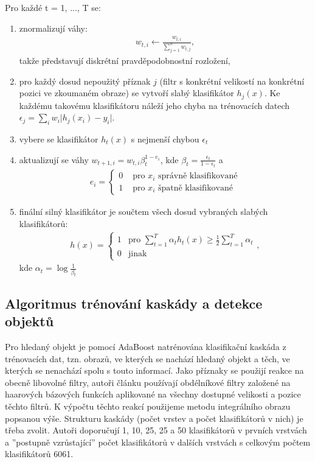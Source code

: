 	Pro každé t = 1, ..., T se:
	
	\begin{enumerate}
		\item znormalizují váhy:
		\begin{align}
			w_{t,i} \leftarrow \frac{w_{t,i}}{\sum_{j=1}^{n}w_{t,j}},
		\end{align}
		takže představují diskrétní pravděpodobnostní rozložení,
		\item pro každý dosud nepoužitý příznak $j$ (filtr s konkrétní velikostí na konkrétní pozici ve zkoumaném obraze) se vytvoří slabý klasifikátor $h_j(x)$. Ke každému takovému klasifikátoru náleží jeho chyba na trénovacích datech $\epsilon_j = \sum_{i} w_i \lvert h_j(x_i)-y_i \rvert$.
		\item vybere se klasifikátor $h_t(x)$ s nejmenší chybou $\epsilon_t$
		\item aktualizují se váhy $w_{t+1,i} = w_{t,i}\beta_t^{1-e_i}$, kde $\beta_t = \frac{\epsilon_t}{1 - \epsilon_t}$ a 
		\begin{align}
		e_i = \begin{cases}
		0 & \text{ pro } x_i \text{ správně klasifikované} \\
		1 & \text{ pro } x_i \text{ špatně klasifikované} 
		\end{cases}
		\end{align} 
		\item finální silný klasifikátor je součtem všech dosud vybraných slabých klasifikátorů:
		\begin{align}
		h(x) = \begin{cases}
				1 & \text{pro } \sum_{t=1}^{T} \alpha_t h_t(x) \geq \frac{1}{2} \sum_{t=1}^{T} \alpha_t \\
				0 & \text{jinak}
			   \end{cases},
		\end{align}
		kde $\alpha_t = \log \frac{1}{\beta_t}$
	\end{enumerate}
	
	\subsection{Algoritmus trénování kaskády a detekce objektů}
	
	Pro hledaný objekt je pomocí AdaBoost natrénována klasifikační kaskáda z trénovacích dat, tzn. obrazů, ve kterých se nachází hledaný objekt a těch, ve kterých se nenachází spolu s touto informací. Jako příznaky se použijí reakce na obecně libovolné filtry, autoři článku používají obdélníkové filtry založené na haarových bázových funkcích aplikované na všechny dostupné velikosti a pozice těchto filtrů. K výpočtu těchto reakcí použijeme metodu integrálního obrazu popsanou výše. Strukturu kaskády (počet vrstev a počet klasifikátorů v nich) je třeba zvolit. Autoři doporučují 1, 10, 25, 25 a 50 klasifikátorů v prvních vrstvách a ''postupně vzrůstající''  počet klasifikátorů v dalších vrstvách s celkovým počtem klasifikátorů 6061.

